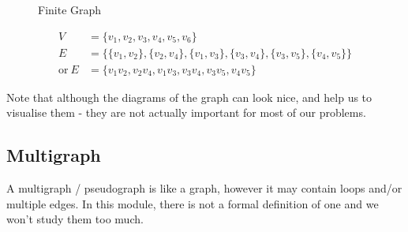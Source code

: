 \begin{minipage}{0.3\textwidth}
    \begin{figure}[H]
        \centering
        \caption{Finite Graph}
    \end{figure}
\end{minipage} \hfill
\begin{minipage}{0.65\textwidth}
\begin{align*}
    V &= \{v_1, v_2, v_3, v_4, v_5, v_6\} \\
    E &= \{\{v_1, v_2\}, \{v_2, v_4\}, \{v_1, v_3\}, \{v_3, v_4\}, \{v_3, v_5\}, \{v_4, v_5\}\} \\
    \mathrm{or\ } E &= \{v_1v_2, v_2v_4, v_1v_3, v_3v_4, v_3v_5, v_4v_5\}
\end{align*}
\end{minipage}\vspace{0.5em}

Note that although the diagrams of the graph can look nice, and help us to visualise them - they are not actually important for most of our problems.

\subsection{Multigraph}
A multigraph / pseudograph is like a graph, however it may contain loops and/or multiple edges. In this module, there is not a formal definition of one and we won't study them too much.

